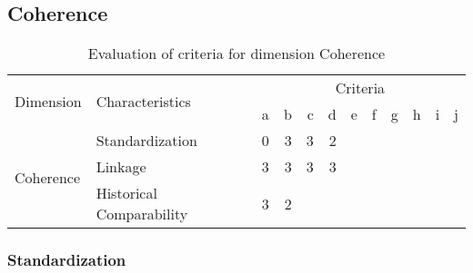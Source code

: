\newpage
\subsection{Coherence}

\begin{table}[htbp]
    \centering

    \begin{tabular}{llrrrrrrrrrr}
        \toprule
        \multirow{2}{*}{Dimension}  & \multirow{2}{*}{Characteristics}  & \multicolumn{10}{c}{Criteria}         \\ \cmidrule(lr){3-12}
                                    &                                   & a & b & c & d & e & f & g & h & i & j \\ \midrule
        \multirow{3}{*}{Coherence}  & Standardization                   & 0 & 3 & 3 & 2 &   &   &   &   &   &   \\
                                    & Linkage                           & 3 & 3 & 3 & 3 &   &   &   &   &   &   \\
                                    & Historical Comparability          & 3 & 2 &   &   &   &   &   &   &   &   \\
        \bottomrule
    \end{tabular}

    \caption{Evaluation of criteria for dimension Coherence}
    \label{table:coherence-benchmark}
\end{table}
\FloatBarrier

\subsubsection{Standardization}

